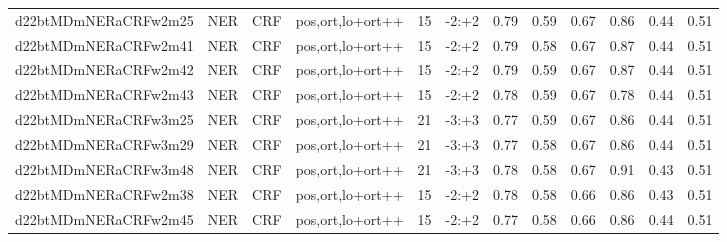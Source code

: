 \documentclass[a4paper]{article}
\begin{document}
\begin{landscape}
\begin{center}
\begin{tabular}{ |c|c|c|c|c|c|c|c|c|c|c|c|}
 
 	
 	\small{ d22btMDmNERaCRFw2m25 } & \small{ NER} & \small{  CRF }  & pos,ort,lo+ort++  &  15 &  \small{  -2:+2 }  &  0.79 & 0.59 & 0.67  &  0.86 & 0.44 & 0.51 \\
 	

 
 	
 	\small{ d22btMDmNERaCRFw2m41 } & \small{ NER} & \small{  CRF }  & pos,ort,lo+ort++  &  15 &  \small{  -2:+2 }  &  0.79 & 0.58 & 0.67  &  0.87 & 0.44 & 0.51 \\
 	

 
 	
 	\small{ d22btMDmNERaCRFw2m42 } & \small{ NER} & \small{  CRF }  & pos,ort,lo+ort++  &  15 &  \small{  -2:+2 }  &  0.79 & 0.59 & 0.67  &  0.87 & 0.44 & 0.51 \\
 	

 
 	
 	\small{ d22btMDmNERaCRFw2m43 } & \small{ NER} & \small{  CRF }  & pos,ort,lo+ort++  &  15 &  \small{  -2:+2 }  &  0.78 & 0.59 & 0.67  &  0.78 & 0.44 & 0.51 \\
 	

 
 	
 	\small{ d22btMDmNERaCRFw3m25 } & \small{ NER} & \small{  CRF }  & pos,ort,lo+ort++  &  21 &  \small{  -3:+3 }  &  0.77 & 0.59 & 0.67  &  0.86 & 0.44 & 0.51 \\
 	

 
 	
 	\small{ d22btMDmNERaCRFw3m29 } & \small{ NER} & \small{  CRF }  & pos,ort,lo+ort++  &  21 &  \small{  -3:+3 }  &  0.77 & 0.58 & 0.67  &  0.86 & 0.44 & 0.51 \\
 	

 
 	
 	\small{ d22btMDmNERaCRFw3m48 } & \small{ NER} & \small{  CRF }  & pos,ort,lo+ort++  &  21 &  \small{  -3:+3 }  &  0.78 & 0.58 & 0.67  &  0.91 & 0.43 & 0.51 \\
 	

 
 	
 	\small{ d22btMDmNERaCRFw2m38 } & \small{ NER} & \small{  CRF }  & pos,ort,lo+ort++  &  15 &  \small{  -2:+2 }  &  0.78 & 0.58 & 0.66  &  0.86 & 0.43 & 0.51 \\
 	

 
 	
 	\small{ d22btMDmNERaCRFw2m45 } & \small{ NER} & \small{  CRF }  & pos,ort,lo+ort++  &  15 &  \small{  -2:+2 }  &  0.77 & 0.58 & 0.66  &  0.86 & 0.44 & 0.51 \\
 	


\end{tabular}
\end{center}
\end{landscape}
\end{document}

